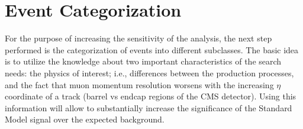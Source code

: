 \section{Event Categorization}\label{section:higgs_categorization}
For the purpose of increasing the sensitivity of the analysis, the next step performed is the categorization of events into different subclasses. The basic idea is to utilize the knowledge about two important characteristics of the search needs: the physics of interest; i.e., differences between the production processes, and the fact that muon momentum resolution worsens with the increasing $\eta$ coordinate of a track (barrel vs endcap regions of the CMS detector). Using this information will allow to substantially increase the significance of the Standard Model signal over the expected background.

